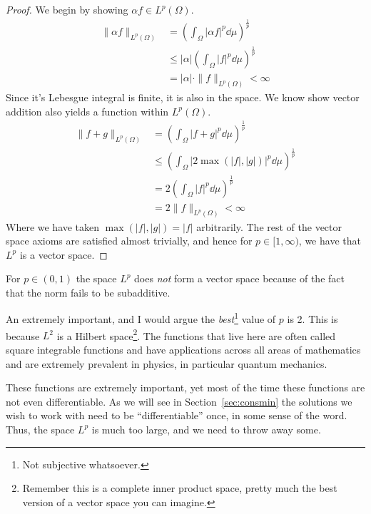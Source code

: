 \begin{proof}
    We begin by showing \(\alpha f\in L^p(\Omega)\).
    \begin{align*}
        \|\alpha f\|_{L^p(\Omega)} & = \left(\int_\Omega |\alpha f|^p\dd{\mu}\right)^\frac{1}{p}     \\
                                   & \leq |\alpha|\left(\int_\Omega |f|^p\dd{\mu}\right)^\frac{1}{p} \\
                                   & = |\alpha|\cdot\|f\|_{L^p(\Omega)} < \infty
    \end{align*}
    Since it's Lebesgue integral is finite, it is also in the space. We know
    show vector addition also yields a function within \(L^p(\Omega)\).
    \begin{align*}
        \|f + g\|_{L^p(\Omega)} & = \left(\int_\Omega |f + g|^p\dd{\mu}\right)^\frac{1}{p}               \\
                                & \leq \left(\int_\Omega |2\max{(|f|,|g|)}|^p\dd{\mu}\right)^\frac{1}{p} \\
                                & = 2\left(\int_\Omega |f|^p\dd{\mu}\right)^\frac{1}{p}                  \\
                                & = 2\|f\|_{L^p(\Omega)} < \infty
    \end{align*}
    Where we have taken \(\max{(|f|,|g|)} = |f|\) arbitrarily. The rest of the
    vector space axioms are satisfied almost trivially, and hence for
    \(p\in[1,\infty)\), we have that \(L^p\) is a vector space. %
\end{proof}

\begin{remark}
    For \(p\in(0,1)\) the space \(L^p\) does \textit{not} form a vector space
    because of the fact that the norm fails to be subadditive.
\end{remark}

An extremely important, and I would argue the \textit{best}\footnote{Not
    subjective whatsoever.} value of \(p\) is 2. This is because \(L^2\) is a
Hilbert space\footnote{Remember this is a complete inner product space, pretty
    much the best version of a vector space you can imagine.}. The functions that
live here are often called square integrable functions and have applications
across all areas of mathematics and are extremely prevalent in physics, in
particular quantum mechanics.

These functions are extremely important, yet most of the time these functions
are not even differentiable. As we will see in Section~\ref{sec:consmin} the
solutions we wish to work with need to be ``differentiable'' once, in some sense
of the word. Thus, the space \(L^p\) is much too large, and we need to throw
away some.

